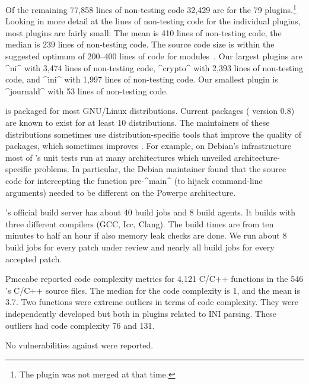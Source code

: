 \begin{code}[language=Cpp,firstnumber=19]
Of the remaining 77,858 lines of non-testing code 32,429 are for the 79 plugins.\footnote{The plugin  was not merged at that time.}
Looking in more detail at the lines of non-testing code for the individual plugins, most plugins are fairly small:
The mean is 410 lines of non-testing code, the median is 239 lines of non-testing code.
The source code size is within the suggested optimum of 200--400 lines of code for modules~\cite{hatton1997reexamining}.
Our largest plugins are ^ni^ with 3,474 lines of non-testing code, ^crypto^ with 2,393 lines of non-testing code, and ^ini^ with 1,997 lines of non-testing code.
Our smallest plugin is ^journald^ with 53 lines of non-testing code.

\elektra{} is packaged for most GNU/Linux distributions.
Current packages (\elektra{} version 0.8) are known to exist for at least 10 distributions.
The maintainers of these distributions sometimes use distribution-specific tools that improve the quality of packages, which sometimes improves \elektra{}.
For example, on Debian's infrastructure most of \elektra{}'s unit tests run at many architectures which unveiled architecture-specific problems.
In particular, the Debian maintainer found that the source code for intercepting the function pre-^main^ (to hijack command-line arguments) needed to be different on the Powerpc architecture.

\elektra{}'s official build server has about 40 build jobs and 8 build agents.
It builds with three different compilers (GCC, Icc, Clang).
The build times are from ten minutes to half an hour if also memory leak checks are done.
We run about 8 build jobs for every patch under review and nearly all build jobs for every accepted patch.

Pmccabe reported code complexity metrics for 4,121 C/C++ functions in the 546 \elektra{}'s C/C++ source files.
The median for the code complexity is 1, and the mean is 3.7.
Two functions were extreme outliers in terms of code complexity.
They were independently developed but both in plugins related to INI parsing.
These outliers had code complexity 76 and 131.



No vulnerabilities against \elektra{} were reported.


\end{code}
